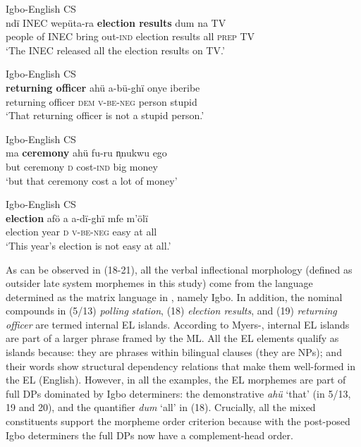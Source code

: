 \documentclass[output=paper]{langsci/langscibook}
\begin{document}
\ea
{Igbo-English CS}\\
\gll ndï    INEC  wepüta-ra  \textbf{election results}   dum  na  TV\\
     people of  INEC  bring out-\textsc{ind}   election results  all  \textsc{prep}  TV\\
\glt ‘The INEC released all the election results on TV.’    
\z

\ea
{Igbo-English CS}\\
\gll \textbf{returning officer  }ahü       a-bü-ghï        onye    iberibe\\
     returning officer     \textsc{dem}  \textsc{v-be-neg}  person  stupid\\
\glt ‘That returning officer is not a stupid person.’
\z

\ea
{Igbo-English CS}\\
\gll ma  \textbf{ceremony   }ahü  fu-ru      n̩nukwu   ego\\
     but ceremony  \textsc{d}  cost-\textsc{ind}  big    money\\
\glt ‘but that ceremony cost a lot of money’
\z

\ea
{Igbo-English CS}\\
\gll \textbf{election  }afö  a  a-dï-ghï  mfe  m’ölï\\
     election    year  \textsc{d}  \textsc{v-be-neg}  easy  at all\\
\glt ‘This year’s election is not easy at all.’
\z

As can be observed in (18-21), all the verbal inflectional morphology (defined as outsider late system morphemes in this study) come from the language determined as the matrix language in , namely Igbo. In addition, the nominal compounds in (5/13) \textit{polling}\textbf{\textit{ }}\textit{station}, (18) \textit{election results}, and (19) \textit{returning officer }are termed internal EL islands. According to Myers-\citet[265]{Scotton2006}, internal EL islands are part of a larger phrase framed by the ML. All the EL elements qualify as islands because: they are phrases within bilingual clauses (they are NPs); and their words show structural dependency relations that make them well-formed in the EL (English). However, in all the examples, the EL morphemes are part of full DPs dominated by Igbo determiners: the demonstrative \textit{ahü} ‘that’ (in 5/13, 19 and 20), and the quantifier \textit{dum }‘all’ in (18). Crucially, all the mixed constituents support the morpheme order criterion because with the post-posed Igbo determiners the full DPs now have a complement-head order. 
\end{document}
